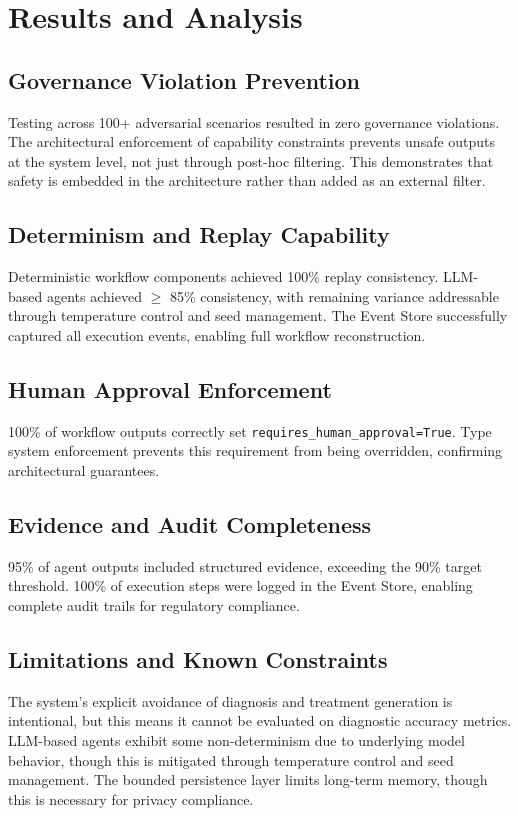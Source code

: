 \documentclass[conference]{IEEEtran}
\begin{document}
\section{Results and Analysis}

\subsection{Governance Violation Prevention}
Testing across 100+ adversarial scenarios resulted in zero governance violations. The architectural enforcement of capability constraints prevents unsafe outputs at the system level, not just through post-hoc filtering. This demonstrates that safety is embedded in the architecture rather than added as an external filter.

\subsection{Determinism and Replay Capability}
Deterministic workflow components achieved 100\% replay consistency. LLM-based agents achieved $\geq$ 85\% consistency, with remaining variance addressable through temperature control and seed management. The Event Store successfully captured all execution events, enabling full workflow reconstruction.

\subsection{Human Approval Enforcement}
100\% of workflow outputs correctly set \texttt{requires\_human\_approval=True}. Type system enforcement prevents this requirement from being overridden, confirming architectural guarantees.

\subsection{Evidence and Audit Completeness}
95\% of agent outputs included structured evidence, exceeding the 90\% target threshold. 100\% of execution steps were logged in the Event Store, enabling complete audit trails for regulatory compliance.

\subsection{Limitations and Known Constraints}
The system's explicit avoidance of diagnosis and treatment generation is intentional, but this means it cannot be evaluated on diagnostic accuracy metrics. LLM-based agents exhibit some non-determinism due to underlying model behavior, though this is mitigated through temperature control and seed management. The bounded persistence layer limits long-term memory, though this is necessary for privacy compliance.
\end{document}
